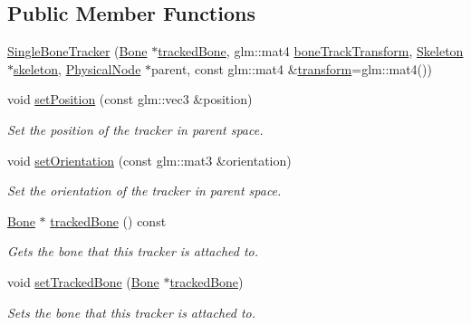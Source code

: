 \subsection*{Public Member Functions}
\begin{DoxyCompactItemize}
\item 
\hyperlink{classmotorcar_1_1SingleBoneTracker_a8e95dd11e004f2b2610d2f92c86d1b60}{Single\-Bone\-Tracker} (\hyperlink{classmotorcar_1_1Bone}{Bone} $\ast$\hyperlink{classmotorcar_1_1SingleBoneTracker_abb942351d9129aca1307bedd3da54a13}{tracked\-Bone}, glm\-::mat4 \hyperlink{classmotorcar_1_1SingleBoneTracker_a2e4fa7ee58217a38f001091f1d3f8d8f}{bone\-Track\-Transform}, \hyperlink{classmotorcar_1_1Skeleton}{Skeleton} $\ast$\hyperlink{classmotorcar_1_1BoneSensor_a71f19e3ae5fac133a9f359c5ba4cef00}{skeleton}, \hyperlink{classmotorcar_1_1PhysicalNode}{Physical\-Node} $\ast$parent, const glm\-::mat4 \&\hyperlink{classmotorcar_1_1SceneGraphNode_ad96e79fdd739ac8223a3128003be391a}{transform}=glm\-::mat4())
\item 
void \hyperlink{classmotorcar_1_1SingleBoneTracker_a66f25aca80c6c03d882369b3d1b40f77}{set\-Position} (const glm\-::vec3 \&position)
\begin{DoxyCompactList}\small\item\em Set the position of the tracker in parent space. \end{DoxyCompactList}\item 
void \hyperlink{classmotorcar_1_1SingleBoneTracker_a2ea129b1f4f2caec8bbb71c48108b794}{set\-Orientation} (const glm\-::mat3 \&orientation)
\begin{DoxyCompactList}\small\item\em Set the orientation of the tracker in parent space. \end{DoxyCompactList}\item 
\hyperlink{classmotorcar_1_1Bone}{Bone} $\ast$ \hyperlink{classmotorcar_1_1SingleBoneTracker_abb942351d9129aca1307bedd3da54a13}{tracked\-Bone} () const 
\begin{DoxyCompactList}\small\item\em Gets the bone that this tracker is attached to. \end{DoxyCompactList}\item 
void \hyperlink{classmotorcar_1_1SingleBoneTracker_a5d508397b62585d59a702fbe37db94ef}{set\-Tracked\-Bone} (\hyperlink{classmotorcar_1_1Bone}{Bone} $\ast$\hyperlink{classmotorcar_1_1SingleBoneTracker_abb942351d9129aca1307bedd3da54a13}{tracked\-Bone})
\begin{DoxyCompactList}\small\item\em Sets the bone that this tracker is attached to. \end{DoxyCompactList}\item 

\end{DoxyCompactItemize}
